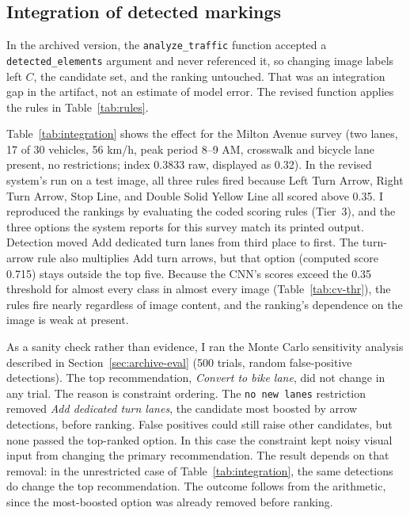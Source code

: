 \documentclass[11pt]{article}
\begin{document}
\subsection{Integration of detected markings}
\label{sec:integration}
In the archived version, the \texttt{analyze\_traffic} function accepted a \texttt{detected\_elements} argument and never referenced it, so changing image labels left $C$, the candidate set, and the ranking untouched. That was an integration gap in the artifact, not an estimate of model error. The revised function applies the rules in Table~\ref{tab:rules}.

Table~\ref{tab:integration} shows the effect for the Milton Avenue survey (two lanes, 17 of 30 vehicles, 56 km/h, peak period 8--9 AM, crosswalk and bicycle lane present, no restrictions; index 0.3833 raw, displayed as 0.32). In the revised system's run on a test image, all three rules fired because Left Turn Arrow, Right Turn Arrow, Stop Line, and Double Solid Yellow Line all scored above 0.35. I reproduced the rankings by evaluating the coded scoring rules (Tier~3), and the three options the system reports for this survey match its printed output. Detection moved Add dedicated turn lanes from third place to first. The turn-arrow rule also multiplies Add turn arrows, but that option (computed score 0.715) stays outside the top five. Because the CNN's scores exceed the 0.35 threshold for almost every class in almost every image (Table~\ref{tab:cv-thr}), the rules fire nearly regardless of image content, and the ranking's dependence on the image is weak at present.

As a sanity check rather than evidence, I ran the Monte Carlo sensitivity analysis described in Section~\ref{sec:archive-eval} (500 trials, random false-positive detections). The top recommendation, \emph{Convert to bike lane}, did not change in any trial. The reason is constraint ordering. The \texttt{no new lanes} restriction removed \emph{Add dedicated turn lanes}, the candidate most boosted by arrow detections, before ranking. False positives could still raise other candidates, but none passed the top-ranked option. In this case the constraint kept noisy visual input from changing the primary recommendation. The result depends on that removal: in the unrestricted case of Table~\ref{tab:integration}, the same detections do change the top recommendation. The outcome follows from the arithmetic, since the most-boosted option was already removed before ranking.
\end{document}
